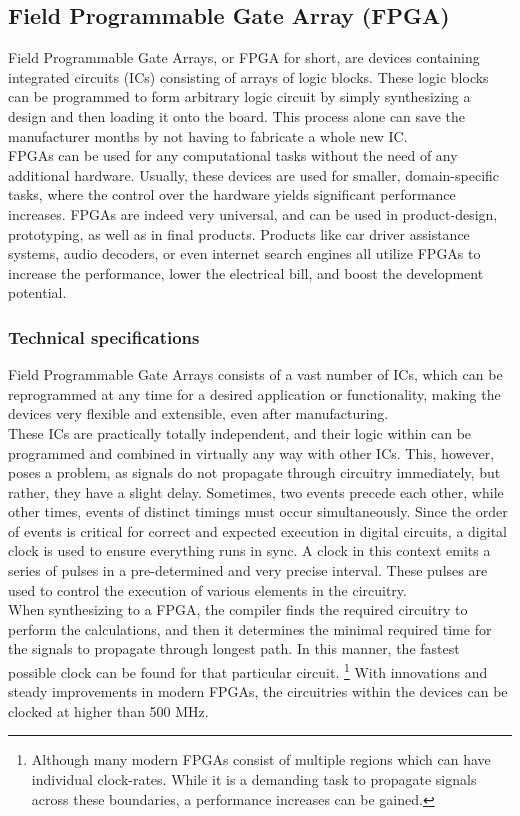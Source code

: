 \subsection{Field Programmable Gate Array (FPGA)}
Field Programmable Gate Arrays, or FPGA for short, are devices containing
integrated circuits (ICs) consisting of arrays of logic blocks.
These logic blocks can be programmed to form arbitrary logic circuit by simply
synthesizing a design and then loading it onto the board. This process alone
can save the manufacturer months by not having to fabricate a whole new IC. \\
FPGAs can be used for any computational tasks without the need of any additional
hardware. Usually, these devices are used for smaller, domain-specific tasks,
where the control over the hardware yields significant performance increases.
FPGAs are indeed very universal, and can be used in product-design, prototyping,
as well as in final products. Products like car driver assistance
systems\cite{xilinx_fpga_automotive}, audio decoders\cite{xilinx_fpga_audio},
or even internet search engines\cite{bing_search_fpga}  all utilize FPGAs to
increase the performance, lower the electrical bill, and boost the development
potential.

\subsubsection{Technical specifications}
Field Programmable Gate Arrays consists of a vast number of ICs, which can
be reprogrammed at any time for a desired application or functionality\cite{ni_fpga},
making the devices very flexible and extensible, even after manufacturing.\\
These ICs are practically totally independent, and their logic within can be
programmed and combined in virtually any way with other ICs. This, however,
poses a problem, as signals do not propagate through circuitry immediately, but
rather, they have a slight delay.
Sometimes, two events precede each other, while other times, events of distinct
timings must occur simultaneously.
Since the order of events is critical for correct and expected execution in
digital circuits, a digital clock is used to ensure everything runs in sync.
A clock in this context emits a series of pulses in a pre-determined and very
precise interval. These pulses are used to control the execution of various
elements in the circuitry.\\
When synthesizing to a FPGA, the compiler finds
the required circuitry to perform the calculations, and then it determines the
minimal required time for the signals to propagate through longest path. In this
manner, the fastest possible clock can be found for that particular circuit.
\footnote{
    Although many modern FPGAs consist of multiple regions which can have individual
    clock-rates. While it is a demanding task to propagate signals across these
    boundaries, a performance increases can be gained.
}
With innovations and steady improvements in modern FPGAs, the circuitries within
the devices can be clocked at higher than 500 MHz\cite{xilinx_fpga}.


